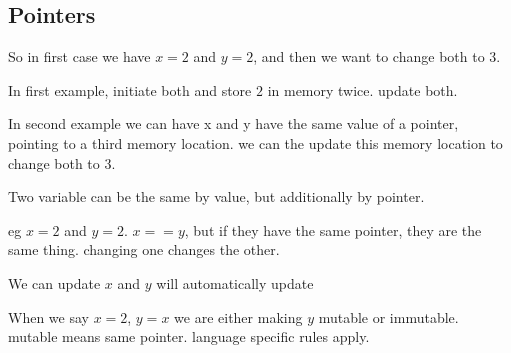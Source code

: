 
\subsection{Pointers}

So in first case we have \(x=2\) and \(y=2\), and then we want to change both to \(3\).

In first example, initiate both and store \(2\) in memory twice. update both.

In second example we can have x and y have the same value of a pointer, pointing to a third memory location. we can the update this memory location to change both to \(3\).

Two variable can be the same by value, but additionally by pointer.

eg \(x=2\) and \(y=2\). \(x==y\), but if they have the same pointer, they are the same thing. changing one changes the other.

We can update \(x\) and \(y\) will automatically update

When we say \(x=2\), \(y=x\) we are either making \(y\) mutable or immutable. mutable means same pointer. language specific rules apply.


